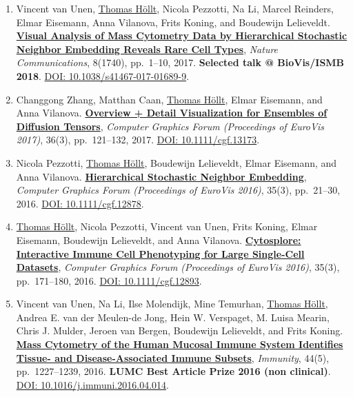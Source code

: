 \documentclass[10pt,a4paper,roman,final]{moderncv}
\newcommand*\highlightauthor[1]{\underline{#1}}
\begin{document}
\begin{enumerate}[leftmargin=0cm,start=2]
\item
Vincent van Unen, \highlightauthor{Thomas Höllt}, Nicola Pezzotti, Na Li, Marcel Reinders, Elmar Eisemann, Anna Vilanova, Frits Koning, and Boudewijn Lelieveldt.
\href{https://www.thomashollt.com/publications/2017_hsne_nature_communications/}{\textbf{Visual Analysis of Mass Cytometry Data by Hierarchical Stochastic Neighbor Embedding Reveals Rare Cell Types}},
\emph{Nature Communications}, 8(1740), pp.~1--10,
2017.
\textbf{Selected talk @ BioVis/ISMB 2018}.
\href{https://doi.org/10.1038/s41467-017-01689-9}{DOI: 10.1038/\allowbreak s41467-017-01689-9}.


\item
Changgong Zhang, Matthan Caan, \highlightauthor{Thomas Höllt}, Elmar Eisemann, and Anna Vilanova.
\href{https://www.thomashollt.com/publications/2017_eurovis_diftens/}{\textbf{Overview + Detail Visualization for Ensembles of Diffusion Tensors}},
\emph{Computer Graphics Forum (Proceedings of EuroVis 2017)}, 36(3), pp.~121--132,
2017.
\href{https://doi.org/10.1111/cgf.13173}{DOI: 10.1111/\allowbreak cgf.13173}.


\item
Nicola Pezzotti, \highlightauthor{Thomas Höllt}, Boudewijn Lelieveldt, Elmar Eisemann, and Anna Vilanova.
\href{https://www.thomashollt.com/publications/2016_eurovis_hsne/}{\textbf{Hierarchical Stochastic Neighbor Embedding}},
\emph{Computer Graphics Forum (Proceedings of EuroVis 2016)}, 35(3), pp.~21--30,
2016.
\href{https://doi.org/10.1111/cgf.12878}{DOI: 10.1111/\allowbreak cgf.12878}.


\item
\highlightauthor{Thomas Höllt}, Nicola Pezzotti, Vincent van Unen, Frits Koning, Elmar Eisemann, Boudewijn Lelieveldt, and Anna Vilanova.
\href{https://www.thomashollt.com/publications/2016_eurovis_cytosplore/}{\textbf{Cytosplore: Interactive Immune Cell Phenotyping for Large Single-Cell Datasets}},
\emph{Computer Graphics Forum (Proceedings of EuroVis 2016)}, 35(3), pp.~171--180,
2016.
\href{https://doi.org/10.1111/cgf.12893}{DOI: 10.1111/\allowbreak cgf.12893}.


\item
Vincent van Unen, Na Li, Ilse Molendijk, Mine Temurhan, \highlightauthor{Thomas Höllt}, Andrea E. van der Meulen-de Jong, Hein W. Verspaget, M. Luisa Mearin, Chris J. Mulder, Jeroen van Bergen, Boudewijn Lelieveldt, and Frits Koning.
\href{https://www.thomashollt.com/publications/2016_immunity_vvu/}{\textbf{Mass Cytometry of the Human Mucosal Immune System Identifies Tissue- and Disease-Associated Immune Subsets}},
\emph{Immunity}, 44(5), pp.~1227--1239,
2016.
\textbf{LUMC Best Article Prize 2016 (non clinical)}.
\href{https://doi.org/10.1016/j.immuni.2016.04.014}{DOI: 10.1016/\allowbreak j.immuni.2016.04.014}.



\end{enumerate}
\end{document}
